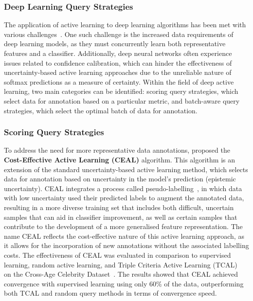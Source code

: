 \subsubsection{Deep Learning Query Strategies}
The application of active learning to deep learning algorithms has been met with various challenges~\citep{ren2021survey}. One such challenge is the increased data requirements of deep learning models, as they must concurrently learn both representative features and a classifier. Additionally, deep neural networks often experience issues related to confidence calibration, which can hinder the effectiveness of uncertainty-based active learning approaches due to the unreliable nature of softmax predictions as a measure of certainty. Within the field of deep active learning, two main categories can be identified: scoring query strategies, which select data for annotation based on a particular metric, and batch-aware query strategies, which select the optimal batch of data for annotation.

\subsubsection{Scoring Query Strategies}
To address the need for more representative data annotations, \cite{wang2017cost} proposed the \textbf{Cost-Effective Active Learning (CEAL)} algorithm. This algorithm is an extension of the standard uncertainty-based active learning method, which selects data for annotation based on uncertainty in the model's prediction (epistemic uncertainty). CEAL integrates a process called pseudo-labelling~\citep{lee2013pseudo}, in which data with low uncertainty used their predicted labels to augment the annotated data, resulting in a more diverse training set that includes both difficult, uncertain samples that can aid in classifier improvement, as well as certain samples that contribute to the development of a more generalised feature representation. The name CEAL reflects the cost-effective nature of this active learning approach, as it allows for the incorporation of new annotations without the associated labelling costs. The effectiveness of CEAL was evaluated in comparison to supervised learning, random active learning, and Triple Criteria Active Learning (TCAL)~\citep{demir2015novel} on the Cross-Age Celebrity Dataset~\citep{chen2014cross}. The results showed that CEAL achieved convergence with supervised learning using only 60\% of the data, outperforming both TCAL and random query methods in terms of convergence speed.

